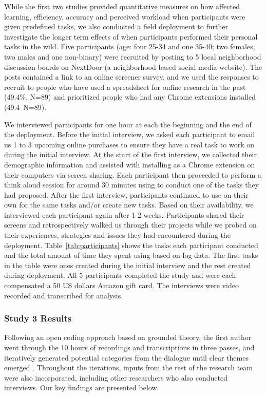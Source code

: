 While the first two studies provided quantitative measures on how \SYSTEM affected learning, efficiency, accuracy and perceived workload when participants were given predefined tasks, we also conducted a field deployment to further investigate the longer term effects of \SYSTEM when participants performed their personal tasks in the wild. Five participants (age: four 25-34 and one 35-40; two females, two males and one non-binary) were recruited by posting to 5 local neighborhood discussion boards on NextDoor (a neighborhood based social media website). The posts contained a link to an online screener survey, and we used the responses to recruit to people who have used a spreadsheet for online research in the past (49.4\%, N=89) and prioritized people who had any Chrome extensions installed (49.4\, N=89). 

We interviewed participants for one hour at each the beginning and the end of the deployment. Before the initial interview, we asked each participant to email us 1 to 3 upcoming online purchases to ensure they have a real task to work on during the initial interview. At the start of the first interview, we collected their demographic information and assisted with installing \SYSTEM as a Chrome extension on their computers via screen sharing. Each participant then proceeded to perform a think aloud session for around 30 minutes using \SYSTEM to conduct one of the tasks they had proposed. After the first interview, participants continued to use \SYSTEM on their own for the same tasks and/or create new tasks. Based on their availability, we interviewed each participant again after 1-2 weeks. Participants shared their screens and retrospectively walked us through their projects while we probed on their experiences, strategies and issues they had encountered during the deployment. Table~\ref{tab:participants} shows the tasks each participant conducted and the total amount of time they spent using \SYSTEM based on log data. The first tasks in the table were ones created during the initial interview and the rest created during deployment. All 5 participants completed the study and were each compensated a 50 US dollars Amazon gift card. The interviews were video recorded and transcribed for analysis.

\subsubsection{Study 3 Results}

Following an open coding approach based on grounded theory, the first author went through the 10 hours of recordings and transcriptions in three passes, and iteratively generated potential categories from the dialogue until clear themes emerged \cite{charmaz2007grounded}. Throughout the iterations, inputs from the rest of the research team were also incorporated, including other researchers who also conducted interviews. Our key findings are presented below.

